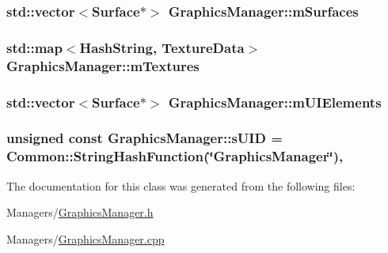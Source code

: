 \subsubsection[{\texorpdfstring{m\+Surfaces}{mSurfaces}}]{\setlength{\rightskip}{0pt plus 5cm}std\+::vector$<${\bf Surface}$\ast$$>$ Graphics\+Manager\+::m\+Surfaces\hspace{0.3cm}{\ttfamily [private]}}\hypertarget{classGraphicsManager_aa30248870f228fce54015450fd3f7726}{}\label{classGraphicsManager_aa30248870f228fce54015450fd3f7726}
\subsubsection[{\texorpdfstring{m\+Textures}{mTextures}}]{\setlength{\rightskip}{0pt plus 5cm}std\+::map$<${\bf Hash\+String}, {\bf Texture\+Data}$>$ Graphics\+Manager\+::m\+Textures\hspace{0.3cm}{\ttfamily [private]}}\hypertarget{classGraphicsManager_aaa8c0e8cd3178da0462a69f78cc39ed1}{}\label{classGraphicsManager_aaa8c0e8cd3178da0462a69f78cc39ed1}
\subsubsection[{\texorpdfstring{m\+U\+I\+Elements}{mUIElements}}]{\setlength{\rightskip}{0pt plus 5cm}std\+::vector$<${\bf Surface}$\ast$$>$ Graphics\+Manager\+::m\+U\+I\+Elements\hspace{0.3cm}{\ttfamily [private]}}\hypertarget{classGraphicsManager_ae08417bb43d000e45aa8b97b25158296}{}\label{classGraphicsManager_ae08417bb43d000e45aa8b97b25158296}
\subsubsection[{\texorpdfstring{s\+U\+ID}{sUID}}]{\setlength{\rightskip}{0pt plus 5cm}unsigned const Graphics\+Manager\+::s\+U\+ID = {\bf Common\+::\+String\+Hash\+Function}(\char`\"{}Graphics\+Manager\char`\"{})\hspace{0.3cm}{\ttfamily [static]}, {\ttfamily [private]}}\hypertarget{classGraphicsManager_a63a569e94f0de22eebd69e5704f7aa3d}{}\label{classGraphicsManager_a63a569e94f0de22eebd69e5704f7aa3d}


The documentation for this class was generated from the following files\+:\begin{DoxyCompactItemize}
\item 
Managers/\hyperlink{GraphicsManager_8h}{Graphics\+Manager.\+h}\item 
Managers/\hyperlink{GraphicsManager_8cpp}{Graphics\+Manager.\+cpp}\end{DoxyCompactItemize}

